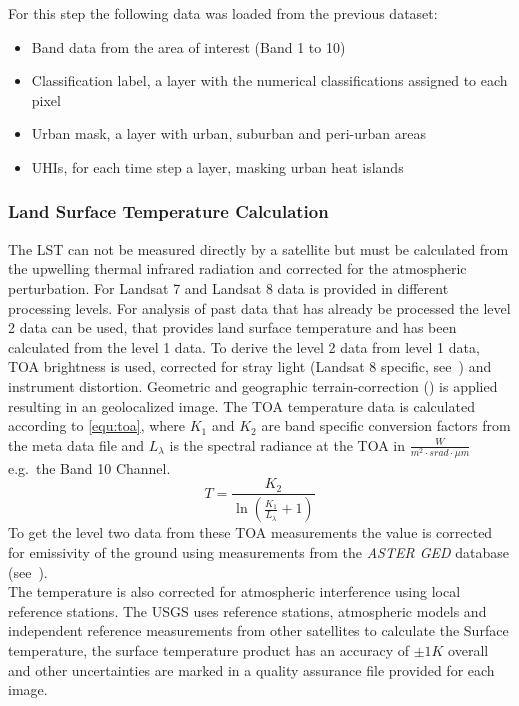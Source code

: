 \documentclass[12pt,a4paper, english,twoside]{scrartcl}
\begin{document}
      For this step the following data was loaded from the previous dataset: 
      \begin{itemize}
        \item Band data from the area of interest (Band 1 to 10)
        \item Classification label, a layer with the numerical classifications assigned to each pixel 
        \item Urban mask, a layer with urban, suburban and peri-urban areas
        \item \glspl{UHI}, for each time step a layer, masking urban heat islands
      \end{itemize}
    \subsubsection{Land Surface Temperature Calculation}\label{sec:lstcalc}
      The \gls{LST} can not be measured directly by a satellite but must be calculated from the upwelling thermal infrared radiation and corrected for the atmospheric perturbation. 
      For Landsat 7 and Landsat 8 data is provided in different processing levels.
      For analysis of past data that has already be processed the level 2 data can be used, that provides land surface temperature and has been calculated from the level 1 data. 
      To derive the level 2 data from level 1 data, \gls{TOA} brightness is used, corrected for stray light (Landsat 8 specific, see~\autocite[p.~67]{Zanter2019}) and instrument distortion. 
      Geometric and geographic terrain-correction (\cite[p.~44]{Zanter2019}) is applied resulting in an geolocalized image.
      The \gls{TOA} temperature data is calculated according to \cref{equ:toa}, where $K_1$ and $K_2$ are band specific conversion factors from the meta data file and $L_\lambda$ is the spectral radiance at the \gls{TOA} in $\frac{W}{m^2\cdot srad \cdot \mu m}$ e.g.\ the Band 10 Channel. 
      \begin{equation}\label{equ:toa}
  	    T = \frac{K_2}{\ln\left(\frac{K_1}{L_{\lambda}}+1\right)}
      \end{equation}
      To get the level two data from these \gls{TOA} measurements the value is corrected for emissivity of the ground using measurements from the \textit{ASTER GED} database (see~\cite{USGSWebsite}).\\
      The temperature is also corrected for atmospheric interference using local reference stations. 
      The \gls{USGS} uses reference stations, atmospheric models and independent reference measurements from other satellites to calculate the Surface temperature, the surface temperature product has an accuracy of $\pm 1 K$ overall and other uncertainties are marked in a quality assurance file provided for each image.\\
\end{document}
